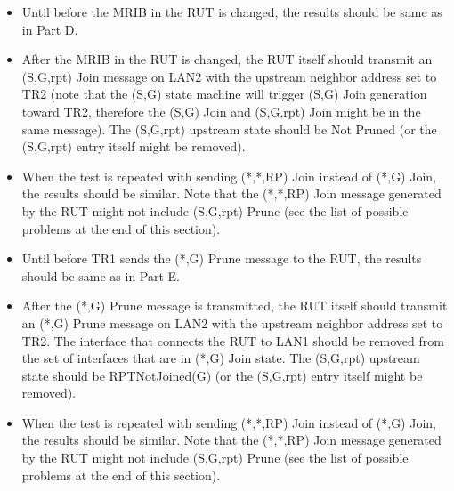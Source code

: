 \documentclass[11pt]{report}
\begin{document}
\begin{itemize}

  \item Until before the MRIB in the RUT is changed, the results should be
  same as in Part D. 

  \item After the MRIB in the RUT is changed, the RUT itself
  should transmit an (S,G,rpt) Join message on LAN2 with the upstream neighbor
  address set to TR2 (note that the (S,G) state machine will trigger (S,G)
  Join generation toward TR2, therefore the (S,G) Join and (S,G,rpt) Join
  might be in the same message). The (S,G,rpt) upstream state should be Not
  Pruned (or the (S,G,rpt) entry itself might be removed).

  \item When the test is repeated with sending (*,*,RP) Join instead of (*,G)
  Join, the results should be similar.
  Note that the (*,*,RP) Join message generated by the RUT might not include
  (S,G,rpt) Prune (see the list of possible problems at the end of this
  section).

\end{itemize}


\begin{itemize}

  \item Until before TR1 sends the (*,G) Prune message to the RUT, the
  results should be same as in Part E.

  \item After the (*,G) Prune message is transmitted, the RUT itself should
  transmit an (*,G) Prune message on LAN2 with the upstream neighbor
  address set to TR2. The interface that connects the RUT to LAN1 should be
  removed from the set of interfaces that are in (*,G) Join state. The
  (S,G,rpt) upstream state should be RPTNotJoined(G) (or the (S,G,rpt) entry
  itself might be removed).

  \item When the test is repeated with sending (*,*,RP) Join instead of (*,G)
  Join, the results should be similar.
  Note that the (*,*,RP) Join message generated by the RUT might not include
  (S,G,rpt) Prune (see the list of possible problems at the end of this
  section).

\end{itemize}
\end{document}
